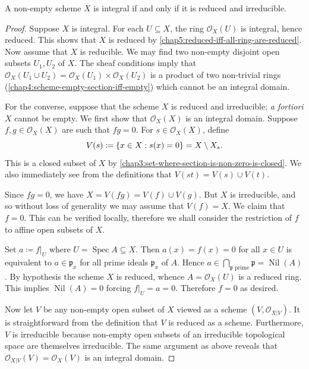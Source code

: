 \documentclass[12pt]{book}
\theoremstyle{definition}
\DeclarePairedDelimiter{\Set}{\lbrace}{\rbrace}
\DeclareMathOperator{\Spec}{Spec}
\DeclareMathOperator{\Nil}{Nil} %
\begin{document}
	\begin{proposition}
		A non-empty scheme $X$ is integral if and only if it is reduced and irreducible.
	\end{proposition}
	\begin{proof}
		Suppose $X$ is integral. For each $U\subseteq X$, the ring $\mathcal{O}_X(U)$ is integral, hence reduced. This shows that $X$ is reduced by \cref{chap5:reduced-iff-all-ring-are-reduced}. Now assume that $X$ is reducible. We may find two non-empty disjoint open subsets $U_1, U_2$ of $X$. The sheaf conditions imply that $\mathcal{O}_X(U_1 \cup U_2) = \mathcal{O}_X(U_1) \times \mathcal{O}_X(U_2)$ is a product of two non-trivial rings (\cref{chap4:scheme-empty-section-iff-empty}) which cannot be an integral domain.
		
		For the converse, suppose that the scheme $X$ is reduced and irreducible; \textit{a fortiori} $X$ cannot be empty. We first show that $\mathcal{O}_X(X)$ is an integral domain. Suppose $f, g \in\mathcal{O}_X(X)$ are such that $fg = 0$. For $s \in \mathcal{O}_X(X)$, define
		\begin{equation*}
			V(s) \coloneqq \Set*{x \in X : s(x) = 0} = X \setminus X_s.
		\end{equation*}
		This is a closed subset of $X$ by \cref{chap3:set-where-section-is-non-zero-is-closed}. We also immediately see from the definitions that $V(st) = V(s) \cup V(t)$.
		
		Since $fg = 0$, we have $X = V(fg) = V(f) \cup V(g)$. But $X$ is irreducible, and so without loss of generality we may assume that $V(f) = X$. We claim that $f = 0$. This can be verified locally, therefore we shall consider the restriction of $f$ to affine open subsets of $X$. 
		
		Set $a \coloneqq f|_U$ where $U = \Spec A \subseteq X$. Then $a(x) = f(x) = 0$ for all $x \in U$ is equivalent to $a \in \mathfrak{p}_x$ for all prime ideals $\mathfrak{p}_x$ of $A$. Hence $a \in \bigcap_{\mathfrak{p} \text{ prime}} \mathfrak{p} = \Nil(A)$. By hypothesis the scheme $X$ is reduced, whence $A = \mathcal{O}_X(U)$ is a reduced ring. This implies $\Nil(A) = 0$ forcing $f|_U = a = 0$. Therefore $f = 0$ as desired.
		
		Now let $V$ be any non-empty open subset of $X$ viewed as a scheme $(V, \mathcal{O}_{X|V})$. It is straightforward from the definition that $V$ is reduced as a scheme. Furthermore, $V$ is irreducible because non-empty open subsets of an irreducible topological space are themselves irreducible. The same argument as above reveals that $\mathcal{O}_{X|V}(V) = \mathcal{O}_X(V)$ is an integral domain.
	\end{proof}
	
\end{document}
